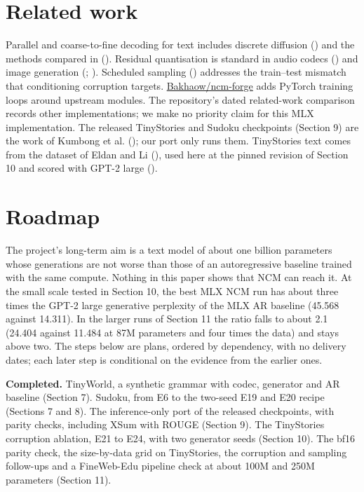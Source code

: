 \documentclass[
  british,
]{article}
\begin{document}
\section{Related work}\label{related-work}

Parallel and coarse-to-fine decoding for text includes discrete
diffusion () and the methods
compared in (). Residual
quantisation is standard in audio codecs
() and image
generation (;
). Scheduled sampling
() addresses the train--test
mismatch that conditioning corruption targets.
\href{https://github.com/Bakhaow/ncm-forge}{Bakhaow/ncm-forge} adds
PyTorch training loops around upstream modules. The repository's dated
related-work comparison records other implementations; we make no
priority claim for this MLX implementation. The released TinyStories and
Sudoku checkpoints (Section 9) are the work of Kumbong et al.
(); our port only runs them.
TinyStories text comes from the dataset of Eldan and Li
(), used here at the
pinned revision of Section 10 and scored with GPT-2 large
().

\section{Roadmap}\label{roadmap}

The project's long-term aim is a text model of about one billion
parameters whose generations are not worse than those of an
autoregressive baseline trained with the same compute. Nothing in this
paper shows that NCM can reach it. At the small scale tested in Section
10, the best MLX NCM run has about three times the GPT-2 large
generative perplexity of the MLX AR baseline (45.568 against 14.311). In
the larger runs of Section 11 the ratio falls to about 2.1 (24.404
against 11.484 at 87M parameters and four times the data) and stays
above two. The steps below are plans, ordered by dependency, with no
delivery dates; each later step is conditional on the evidence from the
earlier ones.

\textbf{Completed.} TinyWorld, a synthetic grammar with codec, generator
and AR baseline (Section 7). Sudoku, from E6 to the two-seed E19 and E20
recipe (Sections 7 and 8). The inference-only port of the released
checkpoints, with parity checks, including XSum with ROUGE (Section 9).
The TinyStories corruption ablation, E21 to E24, with two generator
seeds (Section 10). The bf16 parity check, the size-by-data grid on
TinyStories, the corruption and sampling follow-ups and a FineWeb-Edu
pipeline check at about 100M and 250M parameters (Section 11).
\end{document}
